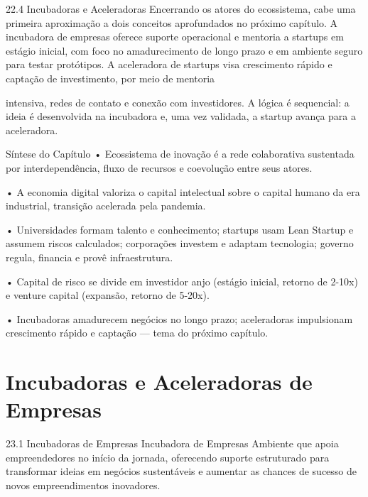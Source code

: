 22.4 Incubadoras e Aceleradoras Encerrando os atores do ecossistema, cabe uma primeira aproximação a dois conceitos aprofundados no próximo capítulo. A incubadora de empresas oferece suporte operacional e mentoria a startups em estágio inicial, com foco no amadurecimento de longo prazo e em ambiente seguro para testar protótipos. A aceleradora de startups visa crescimento rápido e captação de investimento, por meio de mentoria

intensiva, redes de contato e conexão com investidores. A lógica é sequencial: a ideia é desenvolvida na incubadora e, uma vez validada, a startup avança para a aceleradora.

Síntese do Capítulo • Ecossistema de inovação é a rede colaborativa sustentada por interdependência, fluxo de recursos e coevolução entre seus atores.

• A economia digital valoriza o capital intelectual sobre o capital humano da era industrial, transição acelerada pela pandemia.

• Universidades formam talento e conhecimento; startups usam Lean Startup e assumem riscos calculados; corporações investem e adaptam tecnologia; governo regula, financia e provê infraestrutura.

• Capital de risco se divide em investidor anjo (estágio inicial, retorno de 2-10x) e venture capital (expansão, retorno de 5-20x).

• Incubadoras amadurecem negócios no longo prazo; aceleradoras impulsionam crescimento rápido e captação — tema do próximo capítulo.

\chapter{Incubadoras e Aceleradoras de Empresas}

23.1 Incubadoras de Empresas Incubadora de Empresas Ambiente que apoia empreendedores no início da jornada, oferecendo suporte estruturado para transformar ideias em negócios sustentáveis e aumentar as chances de sucesso de novos empreendimentos inovadores.

